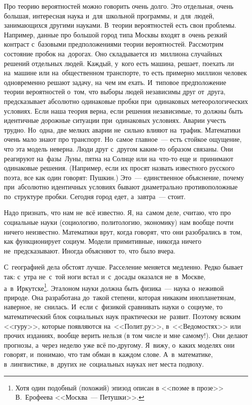 Про теорию вероятностей можно говорить очень долго. Это отдельная, очень большая, интересная наука
и~для~школьной программы, и~для~людей, занимающихся другими науками. В~теории вероятностей есть свои
проблемы. Например, данные про большой город типа Москвы входят в~очень резкий контраст с~базовыми
предположениями теории вероятностей. Рассмотрим состояние пробок на~дорогах. Оно складывается из~миллиона случайных решений отдельных людей.
Каждый, у~кого есть машина, решает, поехать ли
на~машине или на~общественном транспорте, то есть примерно миллион человек одновременно решают
задачу, на~чем им ехать. И~типовое предположение теории вероятностей о~том, что выборы людей
независимы друг от~друга, предсказывает абсолютно одинаковые пробки при~одинаковых метеорологических
условиях. Если наша теория верна, если решения независимые, то должны быть идентичные дорожные
ситуации при~одинаковых условиях. Аварии учесть трудно. Но~одна, две мелких аварии не~сильно влияют
на~трафик. Математики очень мало знают про транспорт. Но~самое главное~--- есть стойкое ощущение,
что эта модель неверна. Люди друг с~другом каким-то образом связаны. Они реагируют на~фазы~Луны, пятна на Солнце или
на~что-то еще и~принимают одинаковые решения. (Например, если их просят назвать известного русского
поэта, все как один говорят: Пушкин.) Это~--- единственное объяснение, почему при~абсолютно
идентичных условиях бывают диаметрально противоположные по~структуре пробки. Сегодня город едет,
а~завтра~--- стоит.

Надо признать, что нам не~всё известно. Я, на~самом деле, считаю, что про социальные науки
(социологию, политологию, экономику) нам вообще почти ничего неизвестно. Математики врут, когда
говорят, что они разобрались в~том, как функционирует социум. Модели примитивные, никогда ничего
не~предсказывают. Иногда объясняют то, что было вчера.

С~географией дела обстоят лучше. Расселение меняется медленно. Редко бывает так: с~утра не~с~той
ноги встал и~с~досады оказался не~в~Москве, а~в~Иркутске\footnote{Хотя один подобный (похожий)
эпизод описан в <<поэме в прозе>> В.~Ерофеева <<Москва~--- Петушки>>.}. Эталоном науки должна быть
физика~--- наука о~неживой природе. Она разработана до~такой степени, которая никаким
инопланетянам, наверное, не~снилась. И~если с~физикой сравнивать науки о~социуме, то математический
блок социальных наук практически не~развит. Поэтому всяким <<гуру>>, которые появляются
на~<<Полит.ру>>, в~<<Ведомостях>> или прочих изданиях, вообще верить нельзя (в том числе и мне
самому!).
 Они делают прогнозы, а~через неделю уже всё по-другому.
Я~вижу, о~каких моделях они говорят, и~понимаю, что там обман в~каждом слове. А~в~математике,
в~лингвистике, в~других не~социальных науках нет места подвоху.


